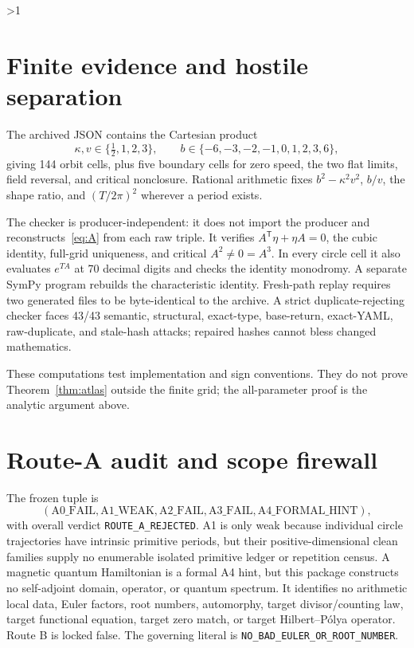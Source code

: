\documentclass[10pt]{article}
\providecommand{\CRevisionRound}{2}
\begin{document}
\ifnum\CRevisionRound>1
\section{Finite evidence and hostile separation}
The archived JSON contains the Cartesian product
\[
 \kappa,v\in\{\tfrac12,1,2,3\},\qquad
 b\in\{-6,-3,-2,-1,0,1,2,3,6\},
\]
giving 144 orbit cells, plus five boundary cells for zero speed, the two flat
limits, field reversal, and critical nonclosure.  Rational arithmetic fixes
$b^2-\kappa^2v^2$, $b/v$, the shape ratio, and
$(T/2\pi)^2$ wherever a period exists.

The checker is producer-independent: it does not import the producer and
reconstructs~\eqref{eq:A} from each raw triple.  It verifies
$A^{\mathsf T}\eta+\eta A=0$, the cubic identity, full-grid uniqueness, and
critical $A^2\ne0=A^3$.  In every circle cell it also evaluates
$e^{TA}$ at 70 decimal digits and checks the identity monodromy.  A separate
SymPy program rebuilds the characteristic identity.  Fresh-path replay
requires two generated files to be byte-identical to the archive.  A strict
duplicate-rejecting checker faces 43/43 semantic, structural, exact-type, base-return,
exact-YAML, raw-duplicate, and stale-hash attacks; repaired hashes cannot
bless changed mathematics.

These computations test implementation and sign conventions.  They do not
prove Theorem~\ref{thm:atlas} outside the finite grid; the all-parameter proof
is the analytic argument above.

\section{Route-A audit and scope firewall}
The frozen tuple is
\[
 (\mathrm{A0\_FAIL},\mathrm{A1\_WEAK},\mathrm{A2\_FAIL},
  \mathrm{A3\_FAIL},\mathrm{A4\_FORMAL\_HINT}),
\]
with overall verdict \texttt{ROUTE\_A\_REJECTED}.  A1 is only weak because
individual circle trajectories have intrinsic primitive periods, but their
positive-dimensional clean families supply no enumerable isolated primitive
ledger or repetition census.  A magnetic quantum
Hamiltonian is a formal A4 hint, but this package constructs no self-adjoint
domain, operator, or quantum spectrum.  It identifies no arithmetic local data, Euler factors, root numbers,
automorphy, target divisor/counting law, target functional equation, target
zero match, or target Hilbert--P\'olya operator.  Route B is locked false.
The governing literal is \texttt{NO\_BAD\_EULER\_OR\_ROOT\_NUMBER}.
\end{document}
